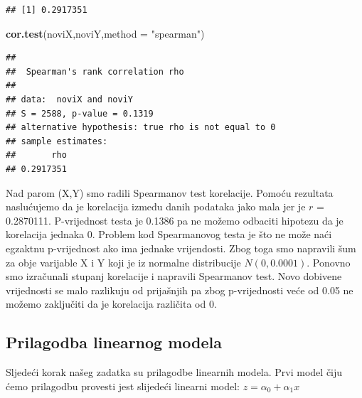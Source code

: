 \documentclass[]{article}
\newenvironment{Shaded}{\begin{snugshade}}{\end{snugshade}}
\newcommand{\KeywordTok}[1]{\textcolor[rgb]{0.13,0.29,0.53}{\textbf{{#1}}}}
\newcommand{\DataTypeTok}[1]{\textcolor[rgb]{0.13,0.29,0.53}{{#1}}}
\newcommand{\StringTok}[1]{\textcolor[rgb]{0.31,0.60,0.02}{{#1}}}
\newcommand{\NormalTok}[1]{{#1}}
\begin{document}
\begin{verbatim}
## [1] 0.2917351
\end{verbatim}

\begin{Shaded}
\begin{Highlighting}[]
\KeywordTok{cor.test}\NormalTok{(noviX,noviY,}\DataTypeTok{method =} \StringTok{"spearman"}\NormalTok{)}
\end{Highlighting}
\end{Shaded}

\begin{verbatim}
## 
##  Spearman's rank correlation rho
## 
## data:  noviX and noviY
## S = 2588, p-value = 0.1319
## alternative hypothesis: true rho is not equal to 0
## sample estimates:
##       rho 
## 0.2917351
\end{verbatim}

Nad parom (X,Y) smo radili Spearmanov test korelacije. Pomoću rezultata
naslućujemo da je korelacija između danih podataka jako mala jer je
\(r\) = 0.2870111. P-vrijednost testa je 0.1386 pa ne možemo odbaciti
hipotezu da je korelacija jednaka 0. Problem kod Spearmanovog testa je
što ne može naći egzaktnu p-vrijednost ako ima jednake vrijendosti. Zbog
toga smo napravili šum za obje varijable X i Y koji je iz normalne
distribucije \(N (0, 0.0001)\). Ponovno smo izračunali stupanj
korelacije i napravili Spearmanov test. Novo dobivene vrijednosti se
malo razlikuju od prijašnjih pa zbog p-vrijednosti veće od 0.05 ne
možemo zaključiti da je korelacija različita od 0.

\subsection{Prilagodba linearnog
modela}\label{prilagodba-linearnog-modela}

Sljedeći korak našeg zadatka su prilagodbe linearnih modela. Prvi model
čiju ćemo prilagodbu provesti jest slijedeći linearni model: \(z =
\alpha_0 + \alpha_1 x \)

\begin{Shaded}
\end{Shaded}
\end{document}
